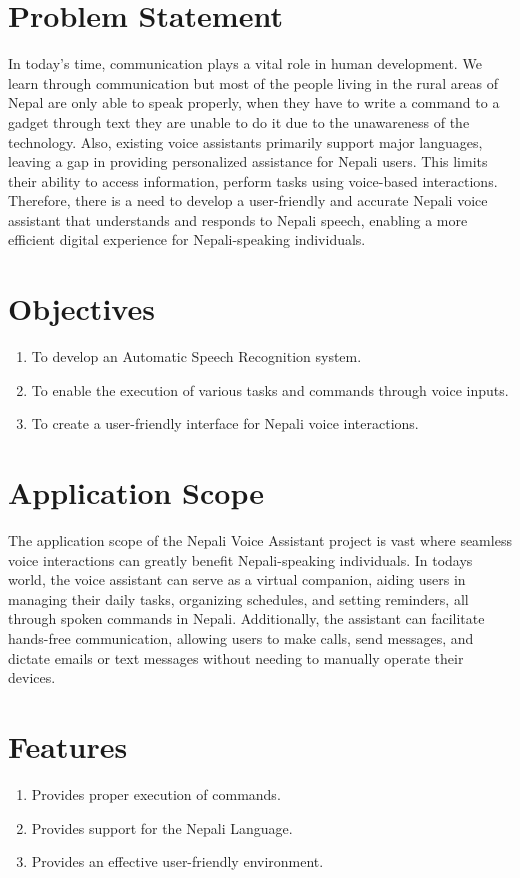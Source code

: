   
\section{Problem Statement}
In today's time, communication plays a vital role in human development. We learn through communication but most of the people living in the rural areas of Nepal are only able to speak properly, when they have to write a command to a gadget through text they are unable to do it due to the unawareness of the technology. Also, existing voice assistants primarily support major languages, leaving a gap in providing personalized assistance for Nepali users. This limits their ability to access information, perform tasks using voice-based interactions. Therefore, there is a need to develop a user-friendly and accurate Nepali voice assistant that understands and responds to Nepali speech, enabling a more efficient digital experience for Nepali-speaking individuals.


\section{Objectives}
\begin{enumerate}[label=\Roman*]
\item To develop an Automatic Speech Recognition system.
\item To enable the execution of various tasks and commands through voice inputs.
\item  To create a user-friendly interface for Nepali voice interactions.
\end{enumerate}
	

   

\section{Application Scope}
The application scope of the Nepali Voice Assistant project is vast  where seamless voice interactions can greatly benefit Nepali-speaking individuals. In todays world, the voice assistant can serve as a virtual companion, aiding users in managing their daily tasks, organizing schedules, and setting reminders, all through spoken commands in Nepali. Additionally, the assistant can facilitate hands-free communication, allowing users to make calls, send messages, and dictate emails or text messages without needing to manually operate their devices.

\section{Features}
\begin{enumerate}
	\item  Provides proper execution of commands.
	\item  Provides support for the Nepali Language.
	\item Provides an effective user-friendly environment.
\end{enumerate}
